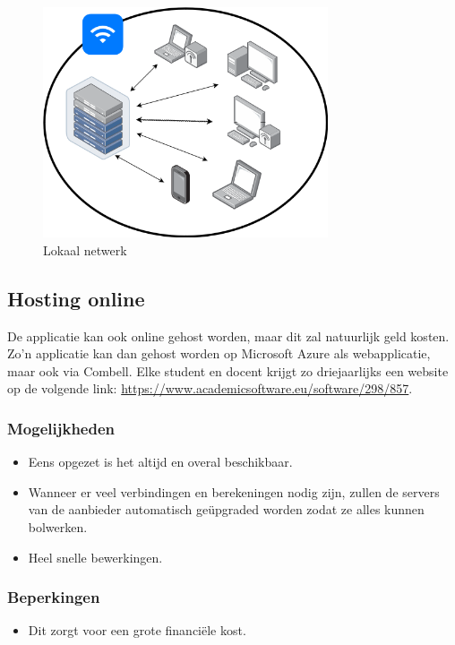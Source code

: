 \begin{figure}
    \centering
    \includegraphics[width=0.75\textwidth]{./img/lokaal_netwerk}
    \caption{\label{fig:lokaal_netwerk} Lokaal netwerk}
\end{figure}

\subsection{Hosting online}
De applicatie kan ook online gehost worden, maar dit zal natuurlijk geld kosten. Zo'n applicatie kan dan gehost worden op Microsoft Azure als webapplicatie, maar ook via Combell. Elke student en docent krijgt zo driejaarlijks een website op de volgende link: \url{https://www.academicsoftware.eu/software/298/857}.
\subsubsection{Mogelijkheden}
\begin{itemize}
    \item Eens opgezet is het altijd en overal beschikbaar.
    \item Wanneer er veel verbindingen en berekeningen nodig zijn, zullen de servers van de aanbieder automatisch geüpgraded worden zodat ze alles kunnen bolwerken.
    \item Heel snelle bewerkingen.
\end{itemize}
\subsubsection{Beperkingen}
\begin{itemize}
    \item Dit zorgt voor een grote financiële kost.
\end{itemize}

